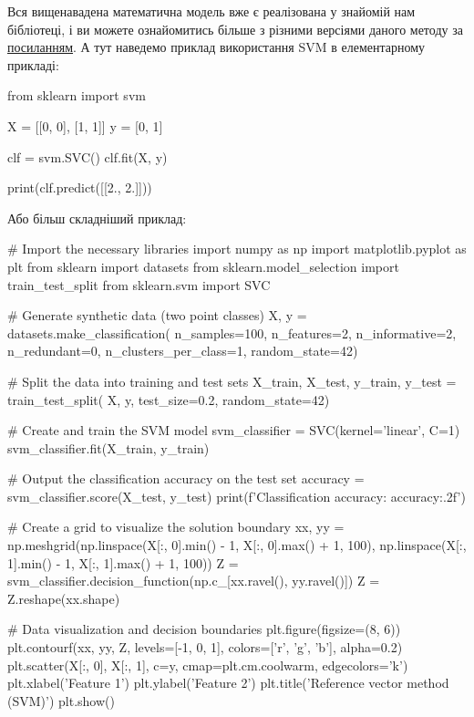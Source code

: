 \documentclass[]{article}
\begin{document}
Вся вищенавадена математична модель вже є реалізована у знайомій нам бібліотеці, і ви можете ознайомитись більше з різними версіями даного методу за \href{https://scikit-learn.org/stable/modules/svm.html}{посиланням}. А тут наведемо приклад використання SVM в елементарному прикладі:

\begin{pythoncode}
from sklearn import svm

X = [[0, 0], [1, 1]]
y = [0, 1]

clf = svm.SVC()
clf.fit(X, y)

print(clf.predict([[2., 2.]]))
\end{pythoncode}


Або більш складніший приклад:

\begin{pythoncode}
# Import the necessary libraries
import numpy as np
import matplotlib.pyplot as plt
from sklearn import datasets
from sklearn.model_selection import train_test_split
from sklearn.svm import SVC

# Generate synthetic data (two point classes)
X, y = datasets.make_classification(
    n_samples=100,
    n_features=2,
    n_informative=2,
    n_redundant=0,
    n_clusters_per_class=1,
    random_state=42)

# Split the data into training and test sets
X_train, X_test, y_train, y_test = train_test_split(
    X, y, test_size=0.2, random_state=42)

# Create and train the SVM model
svm_classifier = SVC(kernel='linear', C=1)
svm_classifier.fit(X_train, y_train)

# Output the classification accuracy on the test set
accuracy = svm_classifier.score(X_test, y_test)
print(f'Classification accuracy: {accuracy:.2f}')

# Create a grid to visualize the solution boundary
xx, yy = np.meshgrid(np.linspace(X[:, 0].min() - 1,
                                 X[:, 0].max() + 1, 100),
                     np.linspace(X[:, 1].min() - 1,
                                 X[:, 1].max() + 1, 100))
Z = svm_classifier.decision_function(np.c_[xx.ravel(), yy.ravel()])
Z = Z.reshape(xx.shape)

# Data visualization and decision boundaries
plt.figure(figsize=(8, 6))
plt.contourf(xx, yy, Z,
             levels=[-1, 0, 1],
             colors=['r', 'g', 'b'], alpha=0.2)
plt.scatter(X[:, 0], X[:, 1], c=y,
            cmap=plt.cm.coolwarm,
            edgecolors='k')
plt.xlabel('Feature 1')
plt.ylabel('Feature 2')
plt.title('Reference vector method (SVM)')
plt.show()
\end{pythoncode}
\end{document}
